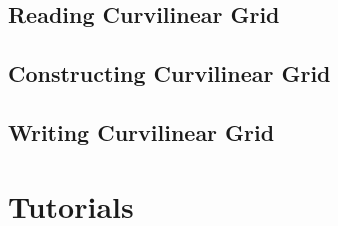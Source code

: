 \documentclass[a4paper,11pt]{book}
\begin{document}






\section{Reading Curvilinear Grid}




\section{Constructing Curvilinear Grid}




\section{Writing Curvilinear Grid}








\chapter{Tutorials}



\end{document}
